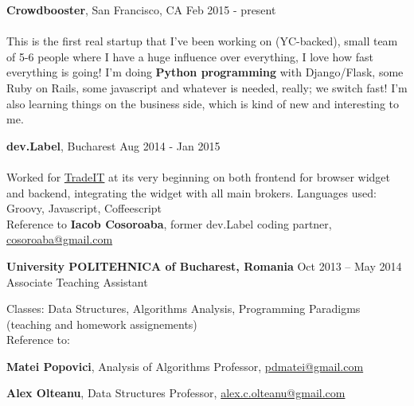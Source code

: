 \documentclass[margin,line]{resume}
\begin{document}
\begin{resume}
    \vspace{1.2mm}\textbf{Crowdbooster}, San Francisco, CA
        \hfill Feb 2015 - present\vspace{1mm}\\
    \selectfont{Software Developer}\vspace{1.2mm}\\
    {\fontsize{2.65mm}{1em}\selectfont
     This is the first real startup that I've been working on (YC-backed), small team of 5-6 people where I have a huge influence over everything, I love how fast everything is going! I'm doing \textbf{Python programming} with Django/Flask, some Ruby on Rails, some javascript and whatever is needed, really; we switch fast! I'm also learning things on the business side, which is kind of new and interesting to me.
    }

    \vspace{1.2mm}\textbf{dev.Label}, Bucharest
        \hfill Aug 2014 - Jan 2015\vspace{1mm}\\
    \selectfont{Frontend \& Backend Developer}\vspace{1.2mm}\\
    {\fontsize{2.65mm}{1em}\selectfont
      Worked for \href{https://www.trade.it/}{TradeIT} at its very beginning on both frontend for browser widget and backend, integrating the widget with all main brokers.
      Languages used: Groovy, Javascript, Coffeescript\\
      Reference to \textbf{Iacob Cosoroaba}, former dev.Label coding partner, \href{mailto:cosoroaba@gmail.com}{cosoroaba@gmail.com}
     }

    \vspace{1.2mm}\textbf{University POLITEHNICA of Bucharest, Romania}
        \hfill Oct 2013 -- May 2014\vspace{1mm}\\
        Associate Teaching Assistant\vspace{1.2mm}\\
    {\fontsize{2.65mm}{1em}\selectfont
      Classes: Data Structures, Algorithms Analysis, Programming Paradigms (teaching and homework assignements)\\
      Reference to:
      \begin{list2}
          \item \textbf{Matei Popovici}, Analysis of Algorithms Professor, \href{mailto:pdmatei@gmail.com}{pdmatei@gmail.com}
          \item \textbf{Alex Olteanu}, Data Structures Professor, \href{mailto:alex.c.olteanu@gmail.com}{alex.c.olteanu@gmail.com}
      \end{list2}
    }


\end{resume}
\end{document}
